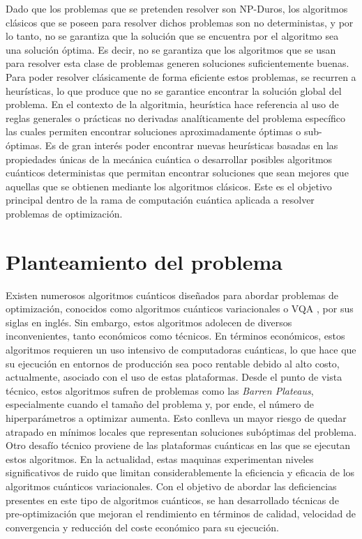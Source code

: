 \newpage

Dado que los problemas que se pretenden resolver son NP-Duros, los algoritmos clásicos que se poseen para resolver dichos problemas son no deterministas, y por lo tanto, no se garantiza que la solución que se encuentra por el algoritmo sea una solución óptima. Es decir, no se garantiza que los algoritmos que se usan para resolver esta clase de problemas generen soluciones suficientemente buenas. Para poder resolver clásicamente de forma eficiente estos problemas, se recurren a heurísticas, lo que produce que no se garantice encontrar la solución global del problema. En el contexto de la algoritmia, heurística hace referencia al uso de reglas generales o prácticas no derivadas analíticamente del problema específico las cuales permiten encontrar soluciones aproximadamente óptimas o sub-óptimas. Es de gran interés poder encontrar nuevas heurísticas basadas en las propiedades únicas de la mecánica cuántica o desarrollar posibles algoritmos cuánticos deterministas que permitan encontrar soluciones que sean mejores que aquellas que se obtienen mediante los algoritmos clásicos. Este es el objetivo principal dentro de la rama de computación cuántica aplicada a resolver problemas de optimización. 

\section{Planteamiento del problema}

Existen numerosos algoritmos cuánticos diseñados para abordar problemas de optimización, conocidos como algoritmos cuánticos variacionales o VQA \citep{cerezo}, por sus siglas en inglés. Sin embargo, estos algoritmos adolecen de diversos inconvenientes, tanto económicos como técnicos. En términos económicos, estos algoritmos requieren un uso intensivo de computadoras cuánticas, lo que hace que su ejecución en entornos de producción sea poco rentable debido al alto costo, actualmente, asociado con el uso de estas plataformas. Desde el punto de vista técnico, estos algoritmos sufren de problemas como las \textit{Barren Plateaus}, especialmente cuando el tamaño del problema y, por ende, el número de hiperparámetros a optimizar aumenta. Esto conlleva un mayor riesgo de quedar atrapado en mínimos locales que representan soluciones subóptimas del problema. Otro desafío técnico proviene de las plataformas cuánticas en las que se ejecutan estos algoritmos. En la actualidad, estas maquinas experimentan niveles significativos de ruido que limitan considerablemente la eficiencia y eficacia de los algoritmos cuánticos variacionales. Con el objetivo de abordar las deficiencias presentes en este tipo de algoritmos cuánticos, se han desarrollado técnicas de pre-optimización que mejoran el rendimiento en términos de calidad, velocidad de convergencia y reducción del coste económico para su ejecución.


